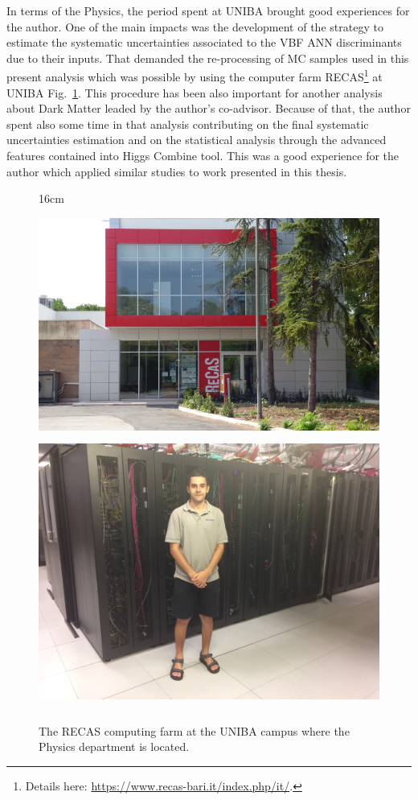 In terms of the Physics, the period spent at UNIBA brought good experiences for the author. One of the main impacts was the development of the strategy to estimate the systematic uncertainties associated to the VBF ANN discriminants due to their inputs. That demanded the re-processing of MC samples used in this present analysis which was possible by using the computer farm RECAS\footnote{Details here: \url{https://www.recas-bari.it/index.php/it/}.} at UNIBA Fig.~\ref{fig:recas_cluster}. This procedure has been also important for another analysis about Dark Matter leaded by the author's co-advisor. Because of that, the author spent also some time in that analysis contributing on the final systematic uncertainties estimation and on the statistical analysis through the advanced features contained into Higgs Combine tool. This was a good experience for the author which applied similar studies to work presented in this thesis. 

\begin{figure}[htbp]{16cm}
	\caption{The RECAS computing farm at the UNIBA campus where the Physics department is located.}
	\centering
	\includegraphics[width=12cm,height=7cm,trim={0cm 0cm 0cm 0cm},clip]{AppendixGlobalDocProject/figs/recas_bari}\\[0.5cm]
	\includegraphics[width=12cm,height=9cm,trim={0cm 0cm 0cm 0cm},clip]{AppendixGlobalDocProject/figs/miqueias_at_recas}
	\label{fig:recas_cluster}
\end{figure}

